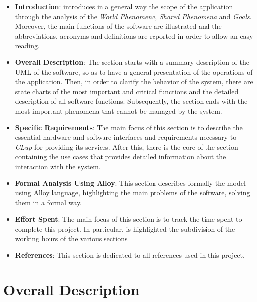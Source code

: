 \documentclass{article}
\begin{document}
	\begin{itemize}
		
		\item {\bfseries Introduction}: introduces in a general way the scope of the application through the analysis of the \emph{World Phenomena}, \emph{Shared Phenomena} and \emph{Goals}. Moreover, the main functions of the software are illustrated and the abbreviations, acronyms and definitions are reported in order to allow an easy reading.
		
		\item {\bfseries Overall Description}: The section starts with a summary description of the UML of the software, so as to have a general presentation of the operations of the application. Then, in order to clarify the behavior of the system, there are state charts of the most important and critical functions and the detailed description of all software functions. Subsequently, the section ends with the most important phenomena that cannot be managed by the system.
		
		\item {\bfseries Specific Requirements}: The main focus of this section is to describe the essential hardware and software interfaces and requirements necessary to \emph{CLup} for providing its services. After this, there is the core of the section containing the use cases that provides detailed information about the interaction with the system.
		
		\item {\bfseries Formal Analysis Using Alloy}: This section describes formally the model using Alloy language, highlighting the main problems of the software, solving them in a formal way.
		
		\item {\bfseries Effort Spent}: The main focus of this section is to track the time spent to complete this project. In particular, is highlighted the subdivision of the working hours of the various sections
		
		\item {\bfseries References}: This section is dedicated to all references used in this project.
		
	\end{itemize}
	
\newpage	

\section{Overall Description}
\end{document}
